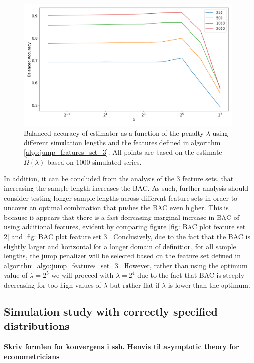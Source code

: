 \begin{figure}[H] 
    \centering
    \includegraphics[width=1\textwidth]{analysis/model_convergence/images/jump_penalties_feature_set_3_all.png}
    \caption [Boxplot of BAC for \jump using feature set 3]{Balanced accuracy of \jump estimator as a function of the penalty $\lambda$ using different simulation lengths and the features defined in algorithm \ref{algo:jump_features_set_3}. All points are based on the estimate $\hat{\Omega} (\lambda)$ based on 1000 simulated series.}
    \label{fig: BAC plot feature set 3 box}
\end{figure}

In addition, it can be concluded from the analysis of the 3 feature sets, that increasing the sample length increases the BAC. As such, further analysis should consider testing longer sample lengths across different feature sets in order to uncover an optimal combination that pushes  the BAC even higher. This is because it appears that there is a fast decreasing marginal increase in BAC of using additional features, evident by comparing figure \ref{fig: BAC plot feature set 2} and \ref{fig: BAC plot feature set 3}. Conclusively, due to the fact that the BAC is slightly larger and horizontal for a longer domain of definition, for all sample lengths, the jump penalizer will be selected based on the feature set defined in algorithm \ref{algo:jump_features_set_3}. However, rather than using the optimum value of $\lambda=2^5$ we will proceed with $\lambda=2^4$ due to the fact that BAC is steeply decreasing for too high values of $\lambda$ but rather flat if $\lambda$ is lower than the optimum.

\subsection{Simulation study with correctly specified distributions}
\label{section:simulation_corspeciffied}
\textbf{Skriv formlen for konvergens i ssh. Henvis til asymptotic theory for econometricians}

